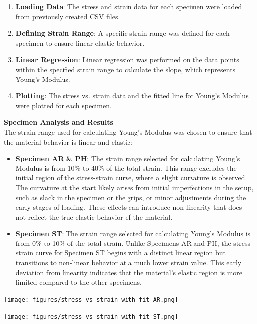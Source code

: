 \documentclass{article}
\begin{document}
\begin{enumerate}
    \item \textbf{Loading Data}: The stress and strain data for each specimen were loaded from previously created CSV files.
    \item \textbf{Defining Strain Range}: A specific strain range was defined for each specimen to ensure linear elastic behavior.
    \item \textbf{Linear Regression}: Linear regression was performed on the data points within the specified strain range to calculate the slope, which represents Young's Modulus.
    \item \textbf{Plotting}: The stress vs. strain data and the fitted line for Young's Modulus were plotted for each specimen.
\end{enumerate}
\newpage
\textbf{Specimen Analysis and Results}\\[8pt]
The strain range used for calculating Young's Modulus was chosen to ensure that the material behavior is linear and elastic:  
\begin{itemize}
    \item \textbf{Specimen AR \& PH}: The strain range selected for calculating Young's Modulus is from 10\% to 40\% of the total strain. This range excludes the initial region of the stress-strain curve, where a slight curvature is observed. The curvature at the start likely arises from initial imperfections in the setup, such as slack in the specimen or the grips, or minor adjustments during the early stages of loading. These effects can introduce non-linearity that does not reflect the true elastic behavior of the material.
    \item \textbf{Specimen ST}: The strain range selected for calculating Young's Modulus is from 0\% to 10\% of the total strain. Unlike Specimens AR and PH, the stress-strain curve for Specimen ST begins with a distinct linear region but transitions to non-linear behavior at a much lower strain value. This early deviation from linearity indicates that the material’s elastic region is more limited compared to the other specimens.
\end{itemize}
\vspace{1em}
\begin{minipage}[t]{0.3\textwidth}
    \centering
    \texttt{[image: figures/stress\_vs\_strain\_with\_fit\_AR.png]}
    \label{fig:stress_strain_AR}
\end{minipage}%
\hfill%
\begin{minipage}[t]{0.3\textwidth}
    \centering
    \texttt{[image: figures/stress\_vs\_strain\_with\_fit\_ST.png]}
    \label{fig:stress_strain_PH}
\end{minipage}%
\end{document}
